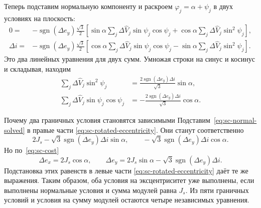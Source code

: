 Теперь подставим нормальную компоненту и раскроем
$\varphi_j=\alpha+\psi_j$ в двух условиях на плоскость:
\begin{equation}
\begin{aligned}
 0={}&-\operatorname{sgn}(\Delta e_y)\frac{\sqrt3}{2}
 \left[\sin\alpha\sum_j\Delta\widehat V_j\sin\psi_j\cos\psi_j
       +\cos\alpha\sum_j\Delta\widehat V_j\sin^2\psi_j\right],\\
 \Delta i={}&-\operatorname{sgn}(\Delta e_y)\frac{\sqrt3}{2}
 \left[\cos\alpha\sum_j\Delta\widehat V_j\sin\psi_j\cos\psi_j
       -\sin\alpha\sum_j\Delta\widehat V_j\sin^2\psi_j\right].
\end{aligned}
\label{eq:sc-normal-balances}
\end{equation}
Это два линейных уравнения для двух сумм. Умножая строки
на синус и косинус и складывая, находим
\begin{equation}
\begin{aligned}
 \sum_j\Delta\widehat V_j\sin^2\psi_j
      &=\frac{2\operatorname{sgn}(\Delta e_y)\Delta i}{\sqrt3}
                         \sin\alpha,\\
 \sum_j\Delta\widehat V_j\sin\psi_j\cos\psi_j
      &=-\frac{2\operatorname{sgn}(\Delta e_y)\Delta i}{\sqrt3}
                         \cos\alpha.
\end{aligned}
\label{eq:sc-normal-solved}
\end{equation}

\begin{explanation}{Почему два граничных условия становятся зависимыми}
Подставим~\eqref{eq:sc-normal-solved} в правые части
\eqref{eq:sc-rotated-eccentricity}. Они станут соответственно
\[
 2J_s-\sqrt3\operatorname{sgn}(\Delta e_y)\Delta i\sin\alpha,
 \qquad -\sqrt3\operatorname{sgn}(\Delta e_y)\Delta i\cos\alpha.
\]
Но по~\eqref{eq:sc-cost}
\[
 \Delta e_x=2J_s\cos\alpha,\qquad
 \Delta e_y=2J_s\sin\alpha-
                      \sqrt3\operatorname{sgn}(\Delta e_y)\Delta i.
\]
Подстановка этих равенств в левые части
\eqref{eq:sc-rotated-eccentricity} даёт те же выражения.
Таким образом, оба условия на эксцентриситет уже выполнены,
если выполнены нормальные условия и сумма модулей равна $J_s$.
Из пяти граничных условий и условия на сумму модулей остаются
четыре независимых уравнения.
\end{explanation}

